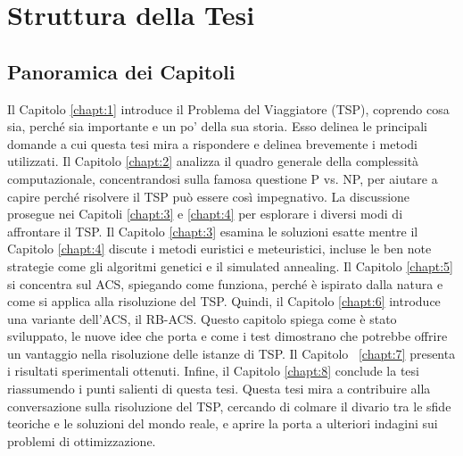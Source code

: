 
\section{Struttura della Tesi}

\subsection{Panoramica dei Capitoli}
Il Capitolo \ref{chapt:1} introduce il Problema del Viaggiatore (TSP), coprendo cosa sia, perché sia importante e un po' della sua storia. Esso delinea le principali domande a cui questa tesi mira a rispondere e delinea brevemente i metodi utilizzati.
Il Capitolo \ref{chapt:2} analizza il quadro generale della complessità computazionale, concentrandosi sulla famosa questione P vs. NP, per aiutare a capire perché risolvere il \Gls{TSP} può essere così impegnativo.
La discussione prosegue nei Capitoli \ref{chapt:3} e \ref{chapt:4} per esplorare i diversi modi di affrontare il \Gls{TSP}.  Il Capitolo \ref{chapt:3} esamina le soluzioni esatte mentre il Capitolo \ref{chapt:4} discute i metodi euristici e meteuristici, incluse le ben note strategie come gli algoritmi genetici e il simulated annealing.
Il Capitolo \ref{chapt:5} si concentra sul \Gls{ACS}, spiegando come funziona, perché è ispirato dalla natura e come si applica alla risoluzione del \Gls{TSP}.
Quindi, il Capitolo \ref{chapt:6} introduce una variante dell'\Gls{ACS}, il \Gls{RB-ACS}. Questo capitolo spiega come è stato sviluppato, le nuove idee che porta e come i test dimostrano che potrebbe offrire un vantaggio nella risoluzione delle istanze di \Gls{TSP}.
Il Capitolo ~\ref{chapt:7} presenta i risultati sperimentali ottenuti.
Infine, il Capitolo \ref{chapt:8} conclude la tesi riassumendo i punti salienti di questa tesi.
Questa tesi mira a contribuire alla conversazione sulla risoluzione del \Gls{TSP}, cercando di colmare il divario tra le sfide teoriche e le soluzioni del mondo reale, e aprire la porta a ulteriori indagini sui problemi di ottimizzazione.
